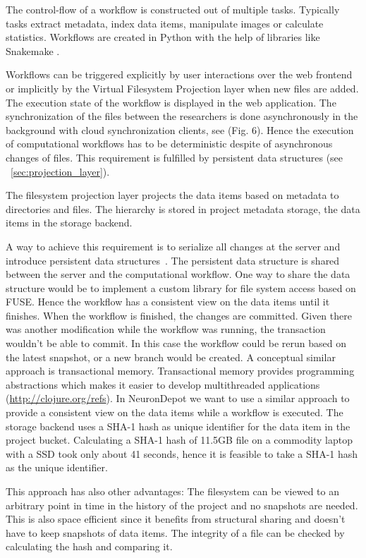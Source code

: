 \documentclass{frontiersSCNS} %
\begin{document}
The control-flow of a workflow is constructed out of multiple tasks. Typically
tasks extract metadata, index data items, manipulate images or calculate
statistics. Workflows are created in Python with the help of libraries like
Snakemake \citep{Koester2012}.

Workflows can be triggered explicitly by user interactions over the web
frontend or implicitly by the Virtual Filesystem Projection layer when new
files are added. The execution state of the workflow is displayed in the web
application. The synchronization of the files between the researchers is done
asynchronously in the background with cloud synchronization clients, see (Fig.
6). Hence the execution of computational workflows  has to be deterministic
despite of asynchronous changes of files. This requirement is fulfilled by
persistent data structures (see ~\ref{sec:projection_layer}).

The filesystem projection layer projects the data items based on metadata to
directories and files. The hierarchy is stored in project metadata storage, the
data items in the storage backend.

A way to achieve this requirement is to serialize all changes at the server and
introduce persistent data structures~\cite{Driscoll1989}. The persistent data
structure is shared between the server and the computational workflow. One way
to share the data structure would be to implement a custom library for file
system access based on FUSE. Hence the workflow has a consistent view on the
data items until it finishes. When the workflow is finished, the changes are
committed. Given there was another modification while the workflow was running,
the transaction wouldn’t be able to commit. In this case the workflow could be
rerun based on the latest snapshot, or a new branch would be created. A
conceptual similar approach is transactional memory. Transactional memory
provides programming abstractions which makes it easier to develop
multithreaded applications (\url{http://clojure.org/refs}). In NeuronDepot we
want to use a similar approach to provide a consistent view on the data items
while a workflow is executed. The storage backend uses a SHA-1 hash as unique
identifier for the data item in the project bucket. Calculating a SHA-1 hash of
11.5GB file on a commodity laptop with a SSD took only about 41 seconds, hence
it is feasible to take a SHA-1 hash as the unique identifier.

This approach has also other advantages: The filesystem can be viewed to an
arbitrary point in time in the history of the project and no snapshots are
needed. This is also space efficient since it benefits from structural sharing
and doesn't have to keep snapshots of data items. The integrity of a file can
be checked by calculating the hash and comparing it.
\end{document}
